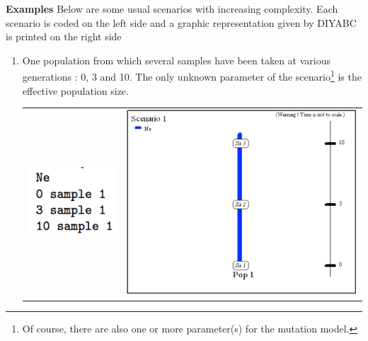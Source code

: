 \textbf{Examples} Below are some usual scenarios with increasing complexity. Each scenario is coded on the left side and a graphic representation given by DIYABC is printed on the right side
\begin{enumerate}
\item One population from which several samples have been taken at
various generations : 0, 3 and 10. The only unknown parameter of the scenario\footnote{Of course, there are also one or more parameter(s) for the mutation model.} is the
 effective population size. \\
\begin{center} 
\begin{tabular}{cc}
\includegraphics[scale=0.5]{code_scenario_01.pdf} & \includegraphics[scale=0.35]{scenario_01.pdf} \\
\end{tabular}
\end{center}


\end{enumerate}
